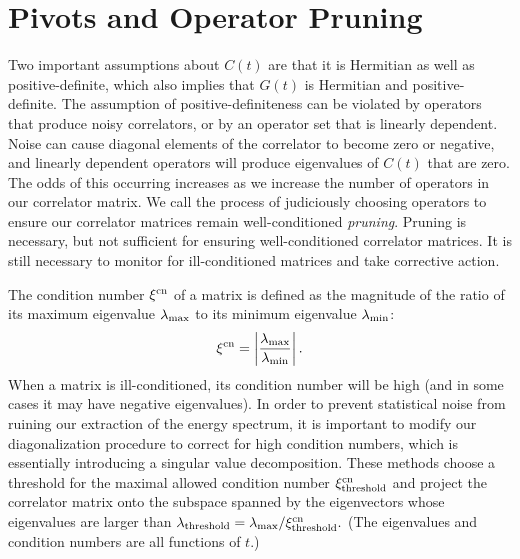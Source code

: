 \section{Pivots and Operator Pruning}
Two important assumptions about $C(t)$ are that it is Hermitian as well as positive-definite, which also implies that $G(t)$ is Hermitian and positive-definite. The assumption of positive-definiteness can be violated by operators that produce noisy correlators, or by an operator set that is linearly dependent. Noise can cause diagonal elements of the correlator to become zero or negative, and linearly dependent operators will produce eigenvalues of $C(t)$ that are zero. The odds of this occurring increases as we increase the number of operators in our correlator matrix. We call the process of judiciously choosing operators to ensure our correlator matrices remain well-conditioned \emph{pruning}. Pruning is necessary, but not sufficient for ensuring well-conditioned correlator matrices. It is still necessary to monitor for ill-conditioned matrices and take corrective action.

The condition number $\xi^{\rm{cn}}$ of a matrix is defined as the magnitude of the ratio of its maximum eigenvalue $\lambda_{\rm{max}}$ to its minimum eigenvalue $\lambda_{\rm{min}}$:
\begin{equation}
    \xi^{\rm{cn}} = \left|\frac{\lambda_{\rm{max}}}{\lambda_{\rm{min}}}\right|.
\end{equation}
When a matrix is ill-conditioned, its condition number will be high (and in some cases it may have negative eigenvalues). In order to prevent statistical noise from ruining our extraction of the energy spectrum, it is important to modify our diagonalization procedure to correct for high condition numbers, which is essentially introducing a singular value decomposition. These methods choose a threshold for the maximal allowed condition number $\xi^{\rm{cn}}_{\rm{threshold}}$ and project the correlator matrix onto the subspace spanned by the eigenvectors whose eigenvalues are larger than $\lambda_{\rm{threshold}} = \lambda_{\rm{max}}/\xi^{\rm{cn}}_{\rm{threshold}}.$ (The eigenvalues and condition numbers are all functions of $t$.)

